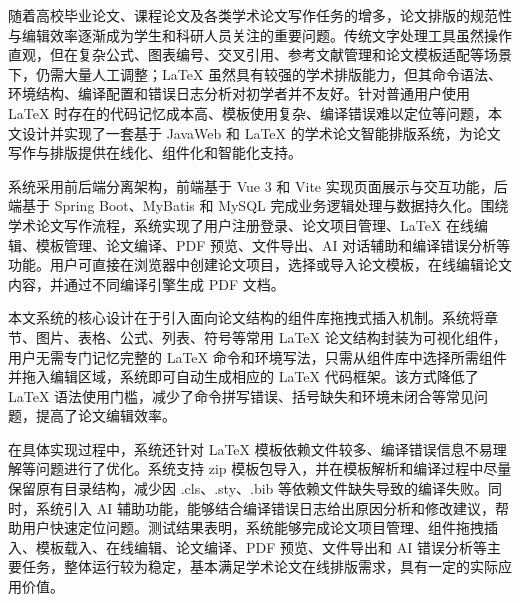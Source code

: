 随着高校毕业论文、课程论文及各类学术论文写作任务的增多，论文排版的规范性与编辑效率逐渐成为学生和科研人员关注的重要问题。传统文字处理工具虽然操作直观，但在复杂公式、图表编号、交叉引用、参考文献管理和论文模板适配等场景下，仍需大量人工调整；LaTeX 虽然具有较强的学术排版能力，但其命令语法、环境结构、编译配置和错误日志分析对初学者并不友好。针对普通用户使用 LaTeX 时存在的代码记忆成本高、模板使用复杂、编译错误难以定位等问题，本文设计并实现了一套基于 JavaWeb 和 LaTeX 的学术论文智能排版系统，为论文写作与排版提供在线化、组件化和智能化支持。

系统采用前后端分离架构，前端基于 Vue 3 和 Vite 实现页面展示与交互功能，后端基于 Spring Boot、MyBatis 和 MySQL 完成业务逻辑处理与数据持久化。围绕学术论文写作流程，系统实现了用户注册登录、论文项目管理、LaTeX 在线编辑、模板管理、论文编译、PDF 预览、文件导出、AI 对话辅助和编译错误分析等功能。用户可直接在浏览器中创建论文项目，选择或导入论文模板，在线编辑论文内容，并通过不同编译引擎生成 PDF 文档。

本文系统的核心设计在于引入面向论文结构的组件库拖拽式插入机制。系统将章节、图片、表格、公式、列表、符号等常用 LaTeX 论文结构封装为可视化组件，用户无需专门记忆完整的 LaTeX 命令和环境写法，只需从组件库中选择所需组件并拖入编辑区域，系统即可自动生成相应的 LaTeX 代码框架。该方式降低了 LaTeX 语法使用门槛，减少了命令拼写错误、括号缺失和环境未闭合等常见问题，提高了论文编辑效率。

在具体实现过程中，系统还针对 LaTeX 模板依赖文件较多、编译错误信息不易理解等问题进行了优化。系统支持 zip 模板包导入，并在模板解析和编译过程中尽量保留原有目录结构，减少因 .cls、.sty、.bib 等依赖文件缺失导致的编译失败。同时，系统引入 AI 辅助功能，能够结合编译错误日志给出原因分析和修改建议，帮助用户快速定位问题。测试结果表明，系统能够完成论文项目管理、组件拖拽插入、模板载入、在线编辑、论文编译、PDF 预览、文件导出和 AI 错误分析等主要任务，整体运行较为稳定，基本满足学术论文在线排版需求，具有一定的实际应用价值。